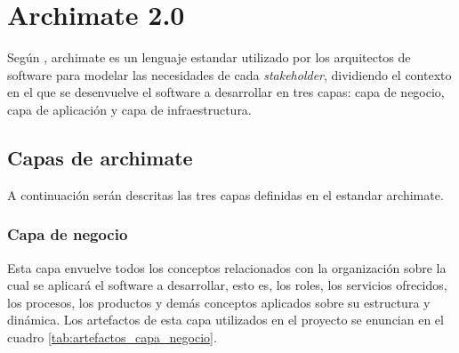 \section{Archimate 2.0}

Según  \cite{archimate2}, archimate es un lenguaje estandar utilizado por los arquitectos de software para modelar las necesidades de cada \textit{stakeholder}, dividiendo el contexto en el que se desenvuelve el software a desarrollar en tres capas: capa de negocio, capa de aplicación y capa de infraestructura.

\subsection{Capas de archimate}

A continuación serán descritas las tres capas definidas en el estandar archimate.

\subsubsection{Capa de negocio}

Esta capa envuelve todos los conceptos relacionados con la organización sobre la cual se aplicará el software a desarrollar, esto es, los roles, los servicios ofrecidos, los procesos, los productos y demás conceptos aplicados sobre su estructura y dinámica. Los artefactos de esta capa utilizados en el proyecto se enuncian en el cuadro \ref{tab:artefactos_capa_negocio}.

